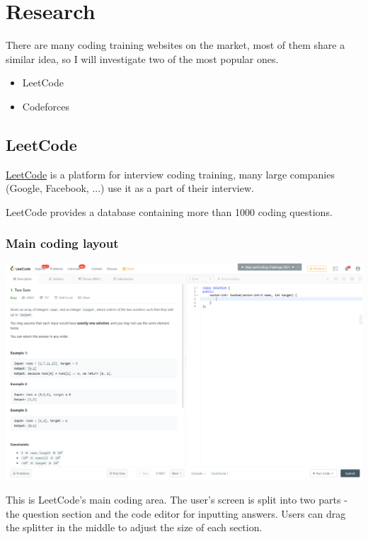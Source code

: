 \documentclass[a4paper]{report}
\begin{document}
\section{Research}

There are many coding training websites on the market, most of them share a similar idea, so I will investigate two of the most popular ones.

\begin{itemize}
    \item LeetCode
    \item Codeforces
\end{itemize}

\subsection{LeetCode}

\href{https://leetcode.com/}{LeetCode} is a platform for interview coding training, many large companies (Google, Facebook, ...) use it as a part of their interview.

LeetCode provides a database containing more than 1000 coding questions.

\subsubsection{Main coding layout}
\includegraphics[width=\linewidth]{Two-Sum-LeetCode-Coding}

This is LeetCode's main coding area. The user's screen is split into two parts - the question section and the code editor for inputting answers. Users can drag the splitter in the middle to adjust the size of each section.
\end{document}
